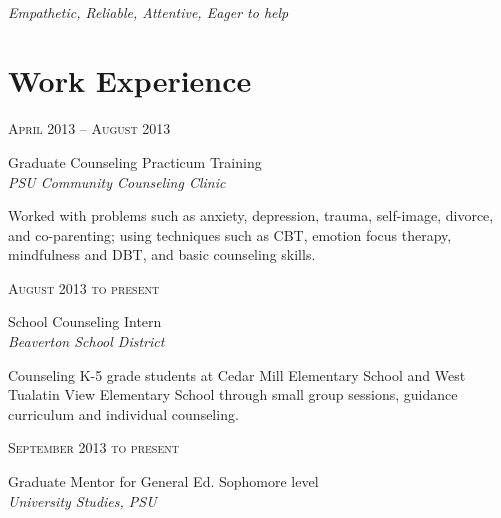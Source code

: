 \documentclass[10pt]{article} %
\begin{document}
\color{text1} %

\par{\\ %
{\color{headings} 
\textit{Empathetic, Reliable, Attentive, Eager to help}
 \\[15pt]\par} %
	

\begin{minipage}[t]{0.5\textwidth} %
\vspace{0pt} %
	
\section{Work Experience} 

{\raggedleft\textsc{April 2013 -- August 2013}\par}

{\raggedright\large Graduate Counseling Practicum Training\\
\textit{PSU Community Counseling Clinic}\\[5pt]}

\normalsize{
Worked with problems such as anxiety, depression, trauma, self-image, divorce, and co-parenting; using techniques such as CBT, emotion focus therapy, mindfulness and DBT, and basic counseling skills.
}\\

{\raggedleft\textsc{August 2013 to present}\par}

{\raggedright\large School Counseling Intern\\
\textit{Beaverton School District}\\[5pt]}

\normalsize{
Counseling K-5 grade students at Cedar Mill Elementary School and West Tualatin View Elementary School through small group sessions, guidance curriculum and individual counseling. 
}\\

{\raggedleft\textsc{September 2013 to present}\par}

{\raggedright\large Graduate Mentor for General Ed. Sophomore level \\
\textit{University Studies, PSU}\\[5pt]}


\end{minipage}}
\end{document}
